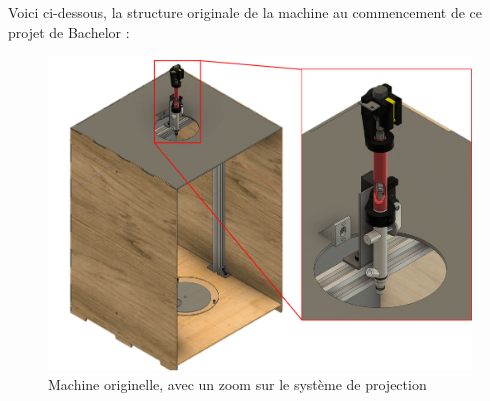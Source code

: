 Voici ci-dessous, la structure originale de la machine au commencement de ce projet de Bachelor :
\begin{figure}[H]
    \centering
    \includegraphics[width = \textwidth]{assets/figures/situation_initiale/machine_initiale.png}
    \caption[Machine originelle]{Machine originelle, avec un zoom sur le système de projection}
    \label{fig:Machine_originale}
\end{figure}

